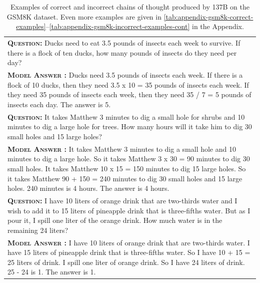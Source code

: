 \begingroup
\begin{table}[t]
    \centering
    \small
    \begin{tabular}{p{\linewidth}}
        \toprule
        \vspace{-2mm}
        \textbf{\textsc{Question:}} Ducks need to eat 3.5 pounds of insects each week to survive. If there is a flock of ten ducks, how many pounds of insects do they need per day? \\
        \vspace{-1mm}
        \textbf{\textsc{Model Answer \color{darkGreen}{(CORRECT)}:}} Ducks need 3.5 pounds of insects each week. If there is a flock of 10 ducks, then they need 3.5 x 10 = 35 pounds of insects each week. If they need 35 pounds of insects each week, then they need 35 / 7 = 5 pounds of insects each day. The answer is 5. \color{darkGreen}{\checkmark} \\
        \midrule
        \vspace{-2mm}
        \textbf{\textsc{Question:}} It takes Matthew 3 minutes to dig a small hole for shrubs and 10 minutes to dig a large hole for trees. How many hours will it take him to dig 30 small holes and 15 large holes? \\
        \vspace{-1mm}
        \textbf{\textsc{Model Answer \color{darkGreen}{(CORRECT)}:}} It takes Matthew 3 minutes to dig a small hole and 10 minutes to dig a large hole. So it takes Matthew 3 x 30 = 90 minutes to dig 30 small holes. It takes Matthew 10 x 15 = 150 minutes to dig 15 large holes. So it takes Matthew 90 + 150 = 240 minutes to dig 30 small holes and 15 large holes. 240 minutes is 4 hours. The answer is 4 hours. \color{darkGreen}{\checkmark} \\
        \midrule
        \vspace{-2mm}
        \textbf{\textsc{Question:}} I have 10 liters of orange drink that are two-thirds water and I wish to add it to 15 liters of pineapple drink that is three-fifths water. But as I pour it, I spill one liter of the orange drink. How much water is in the remaining 24 liters? \\
        \vspace{-1mm}
        \textbf{\textsc{Model Answer \color{blue}{(INCORRECT)}:}} I have 10 liters of orange drink that are two-thirds water. I have 15 liters of pineapple drink that is three-fifths water. So I have 10 + 15 = 25 liters of drink. I spill one liter of orange drink. So I have 24 liters of drink. 25 - 24 is 1. The answer is 1. \color{blue}{\xmark} \\
        \bottomrule
    \end{tabular}
    \vspace{2mm}
    \caption{
    Examples of correct and incorrect chains of thought produced by \lamda{} 137B on the GSM8K dataset.
    Even more examples are given in \cref{tab:appendix-gsm8k-correct-examples}--\cref{tab:appendix-gsm8k-incorrect-examples-cont} in the Appendix.
    }
    \label{tab:main-gsm8k-examples}
\end{table}
\endgroup